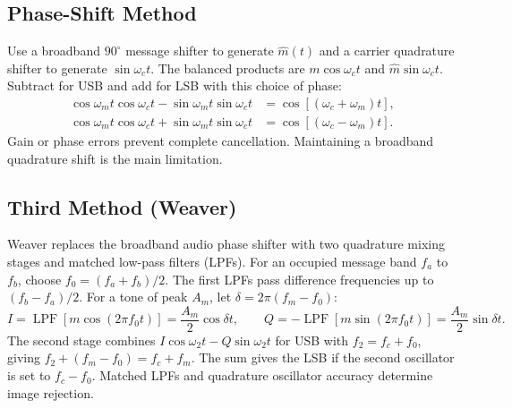 \documentclass[12pt,a4paper]{article}
\begin{document}
\subsection{Phase-Shift Method}
Use a broadband $90^\circ$ message shifter to generate $\widehat m(t)$ and a carrier quadrature shifter to generate $\sin\omega_ct$. The balanced products are $m\cos\omega_ct$ and $\widehat m\sin\omega_ct$. Subtract for USB and add for LSB with this choice of phase:
\[
\begin{aligned}
 \cos\omega_mt\cos\omega_ct-\sin\omega_mt\sin\omega_ct
   &=\cos[(\omega_c+\omega_m)t],\\
 \cos\omega_mt\cos\omega_ct+\sin\omega_mt\sin\omega_ct
   &=\cos[(\omega_c-\omega_m)t].
\end{aligned}
\]
Gain or phase errors prevent complete cancellation. Maintaining a broadband quadrature shift is the main limitation.

\subsection{Third Method (Weaver)}
Weaver replaces the broadband audio phase shifter with two quadrature mixing stages and matched low-pass filters (LPFs). For an occupied message band $f_a$ to $f_b$, choose $f_0=(f_a+f_b)/2$. The first LPFs pass difference frequencies up to $(f_b-f_a)/2$. For a tone of peak $A_m$, let $\delta=2\pi(f_m-f_0)$:
\[
 I=\operatorname{LPF}[m\cos(2\pi f_0t)]
   =\frac{A_m}{2}\cos\delta t,\qquad
 Q=-\operatorname{LPF}[m\sin(2\pi f_0t)]
   =\frac{A_m}{2}\sin\delta t.
\]
The second stage combines $I\cos\omega_2t-Q\sin\omega_2t$ for USB with $f_2=f_c+f_0$, giving $f_2+(f_m-f_0)=f_c+f_m$. The sum gives the LSB if the second oscillator is set to $f_c-f_0$. Matched LPFs and quadrature oscillator accuracy determine image rejection.

\begin{tcolorbox}[tikzbox, unbreakable, title={Weaver Upper Sideband Signal Paths}]
\centering
{}\par
\end{tcolorbox}
\end{document}
